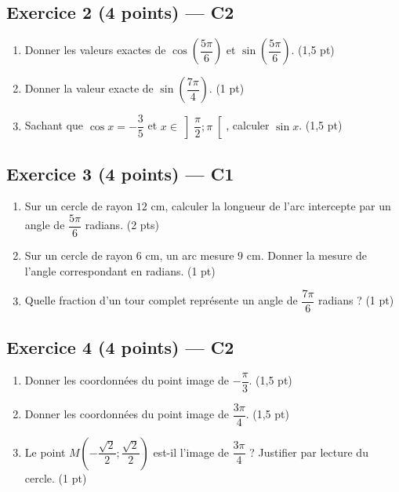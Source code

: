 \subsection*{Exercice 2 \hfill (4 points) — C2}

\begin{enumerate}
  \item Donner les valeurs exactes de $\cos\!\left(\dfrac{5\pi}{6}\right)$ et $\sin\!\left(\dfrac{5\pi}{6}\right)$. \hfill (1,5 pt)
  \item Donner la valeur exacte de $\sin\!\left(\dfrac{7\pi}{4}\right)$. \hfill (1 pt)
  \item Sachant que $\cos x = -\dfrac{3}{5}$ et $x \in \left]\dfrac{\pi}{2};\pi\right[$, calculer $\sin x$. \hfill (1,5 pt)
\end{enumerate}

\subsection*{Exercice 3 \hfill (4 points) — C1}

\begin{enumerate}
  \item Sur un cercle de rayon $12$ cm, calculer la longueur de l'arc intercepte par un angle de $\dfrac{5\pi}{6}$ radians. \hfill (2 pts)
  \item Sur un cercle de rayon $6$ cm, un arc mesure $9$ cm. Donner la mesure de l'angle correspondant en radians. \hfill (1 pt)
  \item Quelle fraction d'un tour complet représente un angle de $\dfrac{7\pi}{6}$ radians ? \hfill (1 pt)
\end{enumerate}

\subsection*{Exercice 4 \hfill (4 points) — C2}

\begin{enumerate}
  \item Donner les coordonnées du point image de $-\dfrac{\pi}{3}$. \hfill (1,5 pt)
  \item Donner les coordonnées du point image de $\dfrac{3\pi}{4}$. \hfill (1,5 pt)
  \item Le point $M\left(-\dfrac{\sqrt2}{2};\dfrac{\sqrt2}{2}\right)$ est-il l'image de $\dfrac{3\pi}{4}$ ? Justifier par lecture du cercle. \hfill (1 pt)
\end{enumerate}

